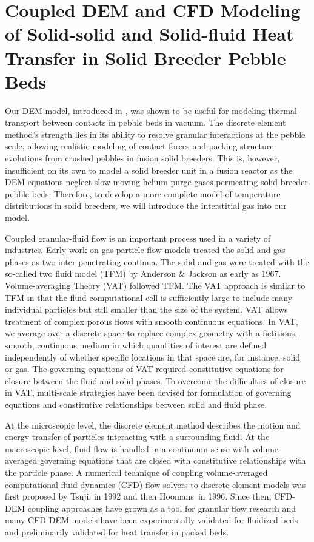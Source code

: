 \chapter{Coupled DEM and CFD Modeling of Solid-solid and Solid-fluid Heat Transfer in Solid Breeder Pebble Beds}\label{ch:cfd-dem-modeling-development}
Our DEM model, introduced in , was shown to be useful for modeling thermal transport between contacts in pebble beds in vacuum. The discrete element method's strength lies in its ability to resolve granular interactions at the pebble scale, allowing realistic modeling of contact forces and packing structure evolutions from crushed pebbles in fusion solid breeders. This is, however, insufficient on its own to model a solid breeder unit in a fusion reactor as the DEM equations neglect slow-moving helium purge gases permeating solid breeder pebble beds. Therefore, to develop a more complete model of temperature distributions in solid breeders, we will introduce the interstitial gas into our model.

Coupled granular-fluid flow is an important process used in a variety of industries.\cite{Zhou2010,Kloss2012} Early work on gas-particle flow models treated the solid and gas phases as two inter-penetrating continua. The solid and gas were treated with the so-called two fluid model (TFM) by Anderson \& Jackson as early as 1967.\cite{Anderson1967} Volume-averaging Theory (VAT) followed TFM. The VAT approach is similar to TFM in that the fluid computational cell is sufficiently large to include many individual particles but still smaller than the size of the system.\cite{Enwald1996} VAT allows treatment of complex porous flows with smooth continuous equations. In VAT, we average over a discrete space to replace complex geometry with a fictitious, smooth, continuous medium in which quantities of interest are defined independently of whether specific locations in that space are, for instance, solid or gas.\cite{Sbutega2013,whitaker1999method} The governing equations of VAT required constitutive equations for closure between the fluid and solid phases. To overcome the difficulties of closure in VAT, multi-scale strategies have been devised for formulation of governing equations and constitutive relationships between solid and fluid phase. 

At the microscopic level, the discrete element method describes the motion and energy transfer of particles interacting with a surrounding fluid. At the macroscopic level, fluid flow is handled in a continuum sense with volume-averaged governing equations that are closed with constitutive relationships with the particle phase.\cite{Tsuji1992,Xu1997} A numerical technique of coupling volume-averaged computational fluid dynamics (CFD) flow solvers to discrete element models was first proposed by Tsuji\etal. in 1992 and then Hoomans\etal~in 1996.\cite{Tsuji1992,Tsuji1993,Hoomans1996} Since then, CFD-DEM coupling approaches have grown as a tool for granular flow research and many CFD-DEM models have been experimentally validated for fluidized beds and preliminarily validated for heat transfer in packed beds.\cite{Kloss2012,Xu1997,Patankar2001,Swasdisevi2005,Deen2007,Zhang2008,Chu2008,VanBuijtenen2011,Gruber2012,Peng2014}



